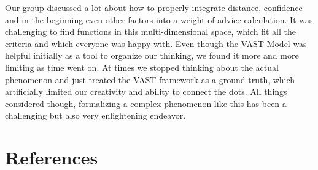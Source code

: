 \documentclass[
  man,floatsintext]{apa6}
\begin{document}
Our group discussed a lot about how to properly integrate distance, confidence and in the beginning even other factors into a weight of advice calculation. It was challenging to find functions in this multi-dimensional space, which fit all the criteria and which everyone was happy with. Even though the VAST Model was helpful initially as a tool to organize our thinking, we found it more and more limiting as time went on. At times we stopped thinking about the actual phenomenon and just treated the VAST framework as a ground truth, which artificially limited our creativity and ability to connect the dots. All things considered though, formalizing a complex phenomenon like this has been a challenging but also very enlightening endeavor.

\newpage

\hypertarget{references}{%
\section{References}\label{references}}
\end{document}
